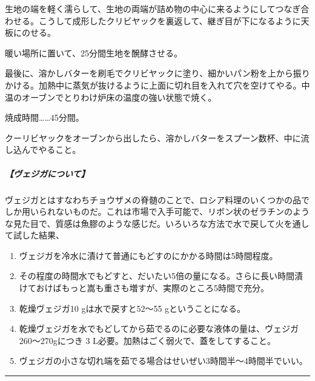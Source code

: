 \begin{recette}
生地の端を軽く濡らして、生地の両端が詰め物の中心に来るようにしてつなぎ合わせる。こうして成形したクリビヤックを裏返して、継ぎ目が下になるように天板にのせる。

暖い場所に置いて、25分間生地を醗酵させる。

最後に、溶かしバターを刷毛でクリビヤックに塗り、細かいパン粉を上から振りかける。加熱中に蒸気が抜けるように上面に切れ目を入れて穴を空けてやる。中温のオーブンでとりわけ炉床の温度の強い状態で焼く。

焼成時間\ldots{}\ldots{}45分間。

クーリビヤックをオーブンから出したら、溶かしバターをスプーン数杯、中に流し込んでやること。

\hypertarget{note-sur-vesiga}{%
\subparagraph{【ヴェジガについて】}\label{note-sur-vesiga}}

ヴェジガとはすなわちチョウザメの脊髄のことで、ロシア料理のいくつかの品でしか用いられないものだ。これは市場で入手可能で、リボン状のゼラチンのような見た目で、質感は魚膠のような感じだ。いろいろな方法で水で戻して火を通して試した結果、

\begin{enumerate}
\def\labelenumi{\arabic{enumi}.}
\item
  ヴェジガを冷水に漬けて普通にもどすのにかかる時間は5時間程度。
\item
  その程度の時間水でもどすと、だいたい5倍の量になる。さらに長い時間漬けておけばもっと嵩も重さも増すが、実際のところ5時間で充分。
\item
  乾燥ヴェジガ10 gは水で戻すと52〜55 gということになる。
\item
  乾燥ヴェジガを水でもどしてから茹でるのに必要な液体の量は、ヴェジガ
  260〜270gにつき 3 L必要。加熱はごく弱火で、蓋をしてすること。
\item
  ヴェジガの小さな切れ端を茹でる場合はせいぜい3時間半〜4時間半でいい。
\end{enumerate}
\end{recette}
\begin{center}\rule{0.5\linewidth}{\linethickness}\end{center}

